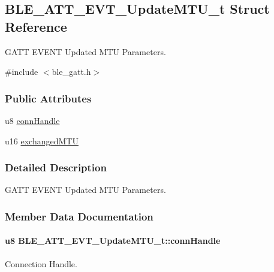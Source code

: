 \hypertarget{struct_b_l_e___a_t_t___e_v_t___update_m_t_u__t}{}\subsection{B\+L\+E\+\_\+\+A\+T\+T\+\_\+\+E\+V\+T\+\_\+\+Update\+M\+T\+U\+\_\+t Struct Reference}
\label{struct_b_l_e___a_t_t___e_v_t___update_m_t_u__t}


G\+A\+TT E\+V\+E\+NT Updated M\+TU Parameters.  




{\ttfamily \#include $<$ble\+\_\+gatt.\+h$>$}

\subsubsection*{Public Attributes}
\begin{DoxyCompactItemize}
\item 
u8 \hyperlink{struct_b_l_e___a_t_t___e_v_t___update_m_t_u__t_a6da2a1d007391658cb0c606b53feba3f}{conn\+Handle}
\item 
u16 \hyperlink{struct_b_l_e___a_t_t___e_v_t___update_m_t_u__t_a34cc079e6441f922db99270ed25d881d}{exchanged\+M\+TU}
\end{DoxyCompactItemize}


\subsubsection{Detailed Description}
G\+A\+TT E\+V\+E\+NT Updated M\+TU Parameters. 

\subsubsection{Member Data Documentation}
\paragraph[{\texorpdfstring{conn\+Handle}{connHandle}}]{\setlength{\rightskip}{0pt plus 5cm}u8 B\+L\+E\+\_\+\+A\+T\+T\+\_\+\+E\+V\+T\+\_\+\+Update\+M\+T\+U\+\_\+t\+::conn\+Handle}\hypertarget{struct_b_l_e___a_t_t___e_v_t___update_m_t_u__t_a6da2a1d007391658cb0c606b53feba3f}{}\label{struct_b_l_e___a_t_t___e_v_t___update_m_t_u__t_a6da2a1d007391658cb0c606b53feba3f}
Connection Handle. 

